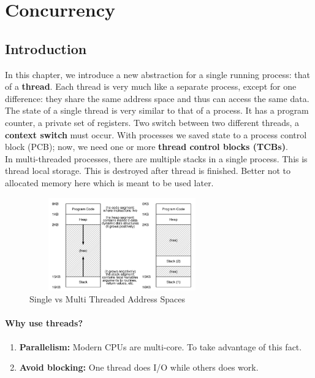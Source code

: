 \chapter{Concurrency}

\section{Introduction}

In this chapter, we introduce a new abstraction for a single running process:
that of a \textbf{thread}. Each thread is very much like a separate process,
except for one difference: they share the same address space and thus can
access the same data.\\

The state of a single thread is very similar to that of a process. It has a
program counter, a private set of registers. Two switch between two different 
threads, a \textbf{context switch} must occur. With processes we saved state to
a process control block (PCB); now, we need one or more \textbf{thread control
blocks (TCBs)}.\\

In multi-threaded processes, there are multiple stacks in a single process. 
This is thread local storage. This is destroyed after thread is finished. 
Better not to allocated memory here which is meant to be used later.

\begin{figure}[h!]
    \begin{center}
        \includegraphics[width=8cm, height=4cm]{img/261.png}
        \caption{Single vs Multi Threaded Address Spaces}
    \end{center}
\end{figure}

\subsubsection{Why use threads?}

\begin{enumerate}
    \item \textbf{Parallelism:} Modern CPUs are multi-core. To take advantage of
        this fact.
    \item \textbf{Avoid blocking:} One thread does I/O while others does work.
\end{enumerate}

